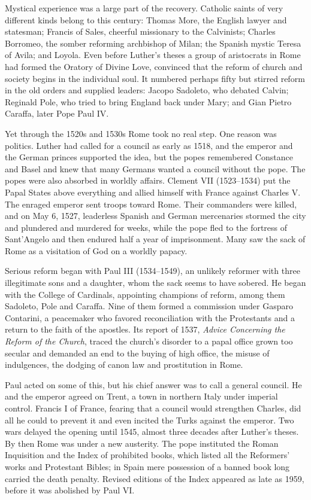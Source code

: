 Mystical experience was a large part of the recovery. Catholic saints of very different kinds belong to this century: Thomas More, the English lawyer and statesman; Francis of Sales, cheerful missionary
to the Calvinists; Charles Borromeo, the somber reforming archbishop of Milan; the Spanish mystic
Teresa of Avila; and Loyola. Even before Luther's theses a group of aristocrats in Rome had formed
the Oratory of Divine Love, convinced that the reform of church and society begins in the individual
soul. It numbered perhaps fifty but stirred reform in the old orders and supplied leaders: Jacopo
Sadoleto, who debated Calvin; Reginald Pole, who tried to bring England back under Mary; and Gian
Pietro Caraffa, later Pope Paul IV.

Yet through the 1520s and 1530s Rome took no real step. One reason was politics. Luther had called
for a council as early as 1518, and the emperor and the German princes supported the idea, but the
popes remembered Constance and Basel and knew that many Germans wanted a council without the pope.
The popes were also absorbed in worldly affairs. Clement VII (1523--1534) put the Papal States above
everything and allied himself with France against Charles V. The enraged emperor sent troops toward
Rome. Their commanders were killed, and on May 6, 1527, leaderless Spanish and German mercenaries
stormed the city and plundered and murdered for weeks, while the pope fled to the fortress of Sant'Angelo and then endured half a year of imprisonment. Many saw the sack of Rome as a visitation of
God on a worldly papacy.

Serious reform began with Paul III (1534--1549), an unlikely reformer with three illegitimate sons
and a daughter, whom the sack seems to have sobered. He began with the College of Cardinals,
appointing champions of reform, among them Sadoleto, Pole and Caraffa. Nine of them formed a
commission under Gasparo Contarini, a peacemaker who favored reconciliation with the Protestants and a
return to the faith of the apostles. Its report of 1537, \emph{Advice Concerning the Reform of the
Church}, traced the church's disorder to a papal office grown too secular and demanded an end to
the buying of high office, the misuse of indulgences, the dodging of canon law and prostitution in Rome.

Paul acted on some of this, but his chief answer was to call a general council. He and the emperor
agreed on Trent, a town in northern Italy under imperial control. Francis I of France, fearing that a
council would strengthen Charles, did all he could to prevent it and even incited the Turks against
the emperor. Two wars delayed the opening until 1545, almost three decades after Luther's theses. By
then Rome was under a new austerity. The pope instituted the Roman Inquisition and the Index of
prohibited books, which listed all the Reformers' works and Protestant Bibles; in Spain mere
possession of a banned book long carried the death penalty. Revised editions of the Index appeared as late as 1959, before it was abolished by Paul VI.

